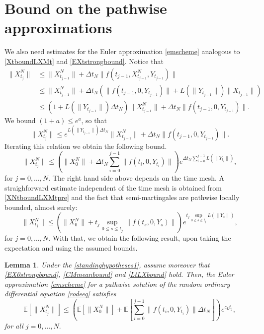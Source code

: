 \documentclass[reqno,12pt]{amsart}
\theoremstyle{plain} %
\newtheorem{lemma}{Lemma}[section]
\theoremstyle{definition} %
\begin{document}
\section{Bound on the pathwise approximations}
\label{secpathwiseapproximation}

We also need estimates for the Euler approximation \cref{emscheme} analogous to \cref{XtboundLXMt} and \cref{EXtstrongbound}. Notice that
\begin{align*}
    \|X_{t_j}^N\| & \leq \|X_{t_{j-1}}^N\| + \Delta t_N \|f(t_{j-1}, X_{t_{j-1}}^N, Y_{t_{j-1}})\| \\
    & \leq \|X_{t_{j-1}}^N\| + \Delta t_N (\|f(t_{j-1}, 0, Y_{t_{j-1}})\| + L(\|Y_{t_{j-1}}\|)\|X_{t_{j-1}}\|) \\
    & \leq \left(1 + L(\|Y_{t_{j-1}}\|)\Delta t_N\right)\|X_{t_{j-1}}^N\| + \Delta t_N \|f(t_{j-1},0,Y_{t_{j-1}})\|.
\end{align*}
We bound $(1 + a) \leq e^a$, so that
\[
    \|X_{t_j}^N\| \leq e^{L(\|Y_{t_{j-1}}\|)\Delta t_N}\|X_{t_{j-1}}^N\| + \Delta t_N \|f(t_{j-1},0,Y_{t_{j-1}})\|.
\]
Iterating this relation we obtain the following bound.
\begin{equation}
    \label{XNtboundLXMtpre}
    \|X_{t_j}^N\| \leq \left(\|X_0^N\| + \Delta t_N \sum_{i=0}^{j-1} \|f(t_i,0,Y_{t_i})\|\right)e^{\Delta t_N \sum_{i=0}^{j-1} L(\|Y_{t_i}\|)},
\end{equation}
for $j = 0, \ldots, N.$ The right hand side above depends on the time mesh. A straighforward estimate independent of the time mesh is obtained from \cref{XNtboundLXMtpre} and the fact that semi-martingales are pathwise locally bounded, almost surely:
\begin{equation}
    \label{XNtboundLXMt}
    \|X_{t_j}^N\| \leq \left(\|X_0^N\| + t_j \sup_{0\leq s\leq t_j} \|f(t_s,0,Y_s)\|\right)e^{t_j \sup_{0\leq s\leq t_j} L(\|Y_s\|)},
\end{equation}
for $j = 0, \ldots, N.$ With that, we obtain the following result, upon taking the expectation and using the assumed bounds.
\begin{lemma}
    \label{lemXNtmeanboundLXMt}
    Under the \cref{standinghypotheses1}, assume moreover that \cref{EX0strongbound}, \cref{CMmeanbound} and \cref{LtLXbound} hold. Then, the Euler approximation \cref{emscheme} for a pathwise solution of the random ordinary differential equation \cref{rodeeq} satisfies
    \begin{equation}
        \label{XNtmeanboundLXMt}
        \mathbb{E}\left[\|X_{t_j}^N\|\right] \leq \left(\mathbb{E}\left[\|X_0^N\|\right] + \mathbb{E}\left[\sum_{i=0}^{j-1} \|f(t_i,0,Y_{t_i})\|\Delta t_N \right] \right)e^{c_L t_j},
    \end{equation}
    for all $j = 0, \ldots, N.$
\end{lemma}
\end{document}
